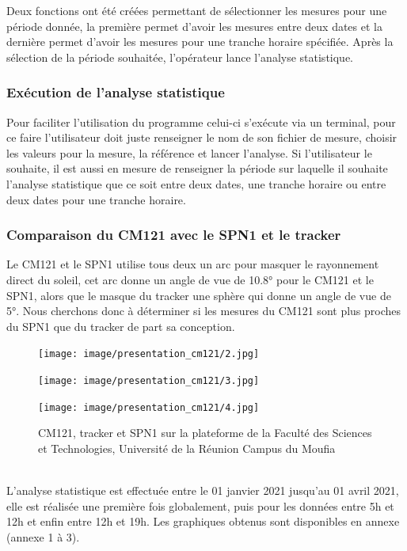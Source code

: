 \documentclass[12pt,a4paper]{article}
\begin{document}
\begin{flushleft}
Deux fonctions ont été créées permettant de sélectionner les mesures pour une période donnée, la première permet d'avoir les mesures entre deux dates et la dernière permet d'avoir les mesures pour une tranche horaire spécifiée. Après la sélection de la période souhaitée, l'opérateur lance l'analyse statistique.

\subsubsection{Exécution de l'analyse statistique}

Pour faciliter l'utilisation du programme celui-ci s'exécute via un terminal, pour ce faire l'utilisateur doit juste renseigner le nom de son fichier de mesure, choisir les valeurs pour la mesure, la référence et lancer l'analyse. Si l'utilisateur le souhaite, il est aussi en mesure de renseigner la période sur laquelle il souhaite l'analyse statistique que ce soit entre deux dates, une tranche horaire ou entre deux dates pour une tranche horaire.


\subsubsection{Comparaison du CM121 avec le SPN1 et le tracker}

Le CM121 et le SPN1 utilise tous deux un arc pour masquer le rayonnement direct du soleil, cet arc donne un angle de vue de 10.8° pour le CM121 et le SPN1, alors que le masque du tracker une sphère qui donne un angle de vue de 5°. Nous cherchons donc à déterminer si les mesures du CM121 sont plus proches du SPN1 que du tracker de part sa conception.

\begin{figure}[H]
    \begin{minipage}[c]{.2\linewidth}
        \centering
        \texttt{[image: image/presentation\_cm121/2.jpg]}  

    \end{minipage}
    \hfill%
    \begin{minipage}[c]{.2\linewidth}
        \centering
        \texttt{[image: image/presentation\_cm121/3.jpg]}  

    \end{minipage}
    \hfill%
    \begin{minipage}[c]{.3\linewidth}
        \centering
        \texttt{[image: image/presentation\_cm121/4.jpg]} 

    \end{minipage}
    \caption{CM121, tracker et SPN1 sur la plateforme de la Faculté des Sciences et Technologies, Université de la Réunion Campus du Moufia}
\end{figure}
~\\
L'analyse statistique est effectuée entre le 01 janvier 2021 jusqu'au 01 avril 2021, elle est réalisée une première fois globalement, puis pour les données entre 5h et 12h et enfin entre 12h et 19h. Les graphiques obtenus sont disponibles en annexe (annexe 1 à 3).
~\\




\end{flushleft}
\end{document}
